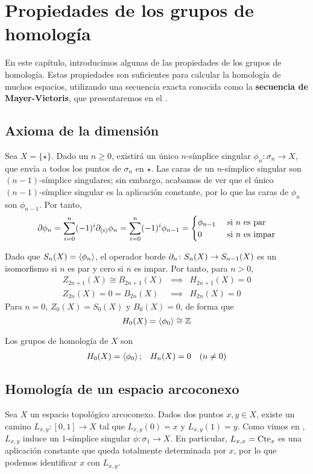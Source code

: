 \setchapterpreamble[u]{\margintoc}

\chapter{Propiedades de los grupos de homología}
En este capítulo, introducimos algunas de las propiedades de los grupos de
homología. Estas propiedades son suficientes para calcular la homología de muchos
espacios, utilizando una secuencia exacta conocida como la \textbf{secuencia de
Mayer-Vietoris}, que presentaremos en el .

\section{Axioma de la dimensión}
Sea $X=\{\star\}$. Dado un $n \geq 0$, existirá un único $n$-símplice singular
$\phi_n\colon\sigma_n \to X$, que envía a todos los puntos de
$\sigma_n$ en $\star$. Las caras de un $n$-símplice singular son $(n-1)$-símplice
singulares; sin embargo, acabamos de ver que el único $(n-1)$-símplice singular
es la aplicación constante, por lo que las caras de $\phi_n$ son $\phi_{n-1}$.
Por tanto,
\begin{align*}
\partial\phi_n=\sum^n_{i=0}(-1)^i\partial_{(i)}\phi_{n}=\sum^n_{i=0}(-1)^i\phi_{n-1}=
\begin{cases}
\phi_{n-1}	&\mbox{ si }n\mbox{ es par}\\
0          	&\mbox{ si }n\mbox{ es impar}
\end{cases}
\end{align*}

Dado que $S_n(X)=\left\langle \phi_n\right\rangle$, el operador borde $\partial_n\colon S_n(X)
\to S_{n-1}(X)$ es un isomorfismo si $n$ es par y cero si $n$ es impar. Por tanto, para
$n > 0$,
\[\begin{array}{rcl}
Z_{2n+1}(X)\cong B_{2n+1}(X)&\implies& H_{2n+1}(X)=0\\[4pt]
Z_{2n}(X)=0=B_{2n}(X) &\implies& H_{2n}(X)=0
\end{array}\]
Para $n=0$, $Z_0(X)=S_0(X)$ y $B_0(X)=0$, de forma que
\[H_0(X)=\left\langle \phi_0\right\rangle \cong \mathbb{Z}\]

\begin{lemma}
Los grupos de homología de $X$ son
\begin{align*}
H_0(X)=\left\langle\phi_0\right\rangle; && H_n(X)=0 \quad (n\neq 0)
\end{align*}
\end{lemma}

\section{Homología de un espacio arcoconexo}
Sea $X$ un espacio topológico arcoconexo. Dados dos puntos $x,y \in X$, existe un
camino $L_{x,y}\colon [0,1] \to X$ tal que $L_{x,y}(0)=x$ y $L_{x,y}(1)=y$. Como
vimos en , $L_{x,y}$ induce un $1$-símplice singular
$\phi\colon \sigma_1 \to X$. En particular, $L_{x,x}=\operatorname{Cte}_x$ es una aplicación
constante que queda totalmente determinada por $x$, por lo que podemos identificar
$x$ con $L_{x,y}$.

